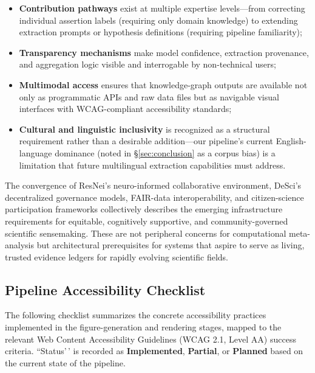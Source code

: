 \documentclass[
  english,
]{article}
\begin{document}
\begin{itemize}
  \item \textbf{Contribution pathways} exist at multiple expertise levels---from correcting individual assertion labels (requiring only domain knowledge) to extending extraction prompts or hypothesis definitions (requiring pipeline familiarity);
  \item \textbf{Transparency mechanisms} make model confidence, extraction provenance, and aggregation logic visible and interrogable by non-technical users;
  \item \textbf{Multimodal access} ensures that knowledge-graph outputs are available not only as programmatic APIs and raw data files but as navigable visual interfaces with WCAG-compliant accessibility standards;
  \item \textbf{Cultural and linguistic inclusivity} is recognized as a structural requirement rather than a desirable addition---our pipeline's current English-language dominance (noted in \S\ref{sec:conclusion} as a corpus bias) is a limitation that future multilingual extraction capabilities must address.
\end{itemize}

The convergence of ResNei's neuro-informed collaborative environment,
DeSci's decentralized governance models, FAIR-data interoperability, and
citizen-science participation frameworks collectively describes the
emerging infrastructure requirements for equitable, cognitively
supportive, and community-governed scientific sensemaking. These are not
peripheral concerns for computational meta-analysis but architectural
prerequisites for systems that aspire to serve as living, trusted
evidence ledgers for rapidly evolving scientific fields.

\FloatBarrier

\subsection{Pipeline Accessibility
Checklist}\label{pipeline-accessibility-checklist}

The following checklist summarizes the concrete accessibility practices
implemented in the figure-generation and rendering stages, mapped to the
relevant Web Content Accessibility Guidelines (WCAG 2.1, Level AA)
success criteria. ``Status'\,' is recorded as \textbf{Implemented},
\textbf{Partial}, or \textbf{Planned} based on the current state of the
pipeline.
\end{document}

